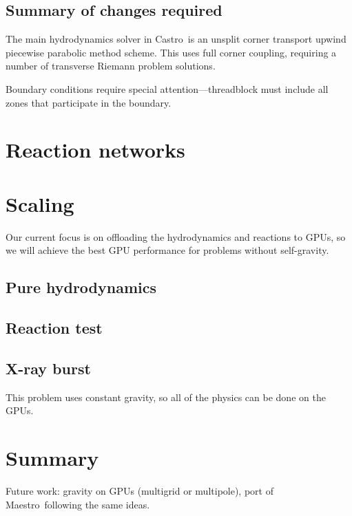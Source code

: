 \documentclass[twocolumn,times]{aastex62}
\newcommand{\castro}{{\sf Castro}}
\newcommand{\maestro}{{\sf Maestro}}
\begin{document}
\subsection{Summary of changes required}

The main hydrodynamics solver in \castro\ is an unsplit corner
transport upwind \citep{ppmunsplit} piecewise parabolic method
\citep{ppm} scheme.  This uses full corner coupling, requiring a 
number of transverse Riemann problem solutions.  


Boundary conditions require special attention---threadblock must include
all zones that participate in the boundary.

\section{Reaction networks}

\section{Scaling}

Our current focus is on offloading the hydrodynamics and reactions to
GPUs, so we will achieve the best GPU performance for problems without
self-gravity.

\subsection{Pure hydrodynamics}

\subsection{Reaction test}

\subsection{X-ray burst}

This problem uses constant gravity, so all of the physics can be done on the GPUs.


\section{Summary}

Future work: gravity on GPUs (multigrid or multipole), port of \maestro\ following
the same ideas.


\end{document}

